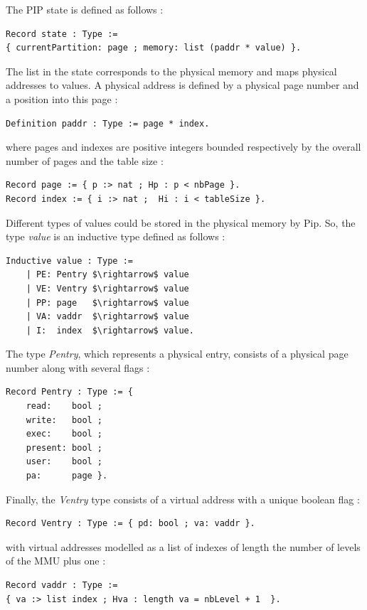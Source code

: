 \noindent The PIP state is defined as follows :
\begin{lstlisting}[linewidth=1.02\linewidth,caption = {PIP state definition},label={PIPstate}] 
Record state : Type := 
{ currentPartition: page ; memory: list (paddr * value) }.
\end{lstlisting}
The list in the state corresponds to the physical memory and maps physical addresses to values. A physical address is defined by a physical page number and a position into this page :
\begin{lstlisting}[caption = {paddr type definition},xleftmargin=.15\textwidth,xrightmargin=.15\textwidth] 
Definition paddr : Type := page * index.
\end{lstlisting}
where pages and indexes are positive integers bounded respectively by the overall number of pages and the table size :
\begin{lstlisting}[caption = {page \& index type definitions},xleftmargin=.05\textwidth,xrightmargin=.05\textwidth]
Record page := { p :> nat ; Hp : p < nbPage }. 
Record index := { i :> nat ;  Hi : i < tableSize }.
\end{lstlisting}
Different types of values could be stored in the physical memory by Pip. So, the type \textit{value} is an inductive type defined as follows :
\begin{lstlisting}[caption = {value type definition}, mathescape=true,xleftmargin=.23\textwidth,
xrightmargin=.23\textwidth]
Inductive value : Type :=
	| PE: Pentry $\rightarrow$ value
	| VE: Ventry $\rightarrow$ value
	| PP: page   $\rightarrow$ value
	| VA: vaddr  $\rightarrow$ value
	| I:  index  $\rightarrow$ value.
\end{lstlisting}
The type \textit{Pentry}, which represents a physical entry, consists of a physical page number along with several flags :
\begin{lstlisting}[caption = {Pentry type definition},xleftmargin=.27\textwidth,
xrightmargin=.27\textwidth]
Record Pentry : Type := {
  	read:    bool ;
   	write:   bool ;
   	exec:    bool ;
   	present: bool ;
   	user:    bool ;
   	pa:      page }.
\end{lstlisting}
Finally, the \textit{Ventry} type consists of a virtual address with a unique boolean flag :
\begin{lstlisting}[caption = {Ventry type definition},xleftmargin=.06\textwidth,xrightmargin=.06\textwidth]
Record Ventry : Type := { pd: bool ; va: vaddr }.
\end{lstlisting}
with virtual addresses modelled as a list of indexes of length the number of levels of the MMU plus one :
\begin{lstlisting}[caption = {vaddr type definition},xleftmargin=.02\textwidth,xrightmargin=.02\textwidth]
Record vaddr : Type := 
{ va :> list index ; Hva : length va = nbLevel + 1  }.
\end{lstlisting}


